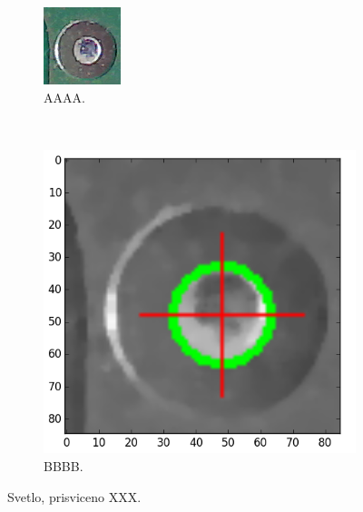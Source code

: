 \begin{figure}[H]
	\centering
	\begin{subfigure}[b]{0.4\textwidth}
		\centering
		\includegraphics[width=0.7\linewidth, trim = 0cm -0.2cm 0cm 0cm]{obrazky/fiduc_svetlo_prisviceno_crop.png}%
		\caption{AAAA.}
		\label{fig:svetlo}
	\end{subfigure}
	~
	\begin{subfigure}[b]{0.4\textwidth}
		\centering
		\includegraphics[width=0.8\linewidth]{obrazky/fiduc_svetlo_prisviceno_crop3.png}%
		\caption{BBBB.}
		\label{fig:svetlo2}
	\end{subfigure}

	\caption{Svetlo, prisviceno XXX.}
\end{figure}


